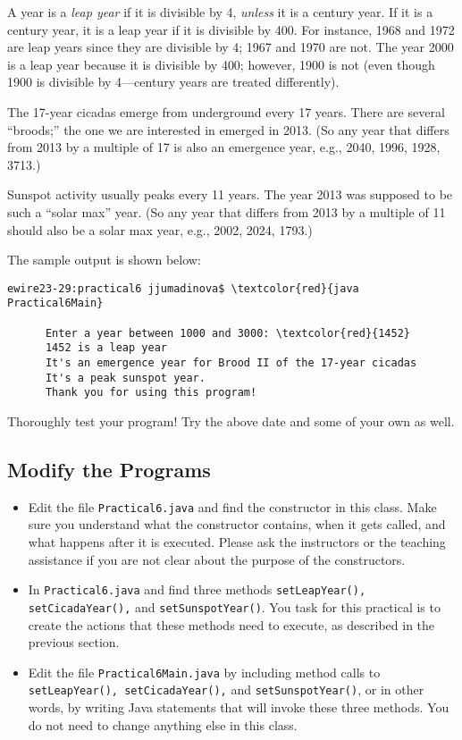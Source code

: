 \noindent A year is a {\em leap year} if it is divisible by 4, {\em unless} it is a century
year. If it is a century year, it is a leap year if it is divisible by 400. For instance,
1968 and 1972 are leap years since they are divisible by 4; 1967 and 1970 are not.
The year 2000 is a leap year because it is divisible by 400; however, 1900 is not (even
though 1900 is divisible by 4---century years are treated differently).

\noindent The 17-year cicadas emerge from underground every 17 years. There are several 
``broods;'' the one we are interested in emerged in 2013. (So any year that differs
from 2013 by a multiple of 17 is also an emergence year, e.g., 2040, 1996, 1928, 3713.)

\noindent Sunspot activity usually peaks every 11 years. The year 2013 was supposed to be such
a ``solar max'' year. (So any year that differs from 2013 by a multiple of 11 should
also be a solar max year, e.g., 2002, 2024, 1793.)


\noindent The sample output is shown below:
\begin{Verbatim}[commandchars=\\\{\}]
      ewire23-29:practical6 jjumadinova$ \textcolor{red}{java Practical6Main}
            
      Enter a year between 1000 and 3000: \textcolor{red}{1452}
      1452 is a leap year
      It's an emergence year for Brood II of the 17-year cicadas
      It's a peak sunspot year.
      Thank you for using this program! 
\end{Verbatim}

\noindent Thoroughly test your program! Try the above date and some of your own as well.

\vspace*{-.1in}
\subsection*{Modify the Programs} 
\vspace*{-.05in}
\begin{itemize}
\item Edit the file {\tt Practical6.java} and find the constructor in this class. Make sure you understand what the constructor contains, when it gets called, and what happens after it is executed. Please ask the instructors or the teaching assistance if you are not clear about the purpose of the constructors. 
\item  In {\tt Practical6.java} and find three methods {\tt setLeapYear(), setCicadaYear(),} and {\tt  setSunspotYear()}. You task for this practical is to create the actions that these methods need to execute, as described in the previous section. 
\item Edit the file {\tt Practical6Main.java} by including method calls to {\tt setLeapYear(), setCicadaYear(),} and {\tt  setSunspotYear()}, or in other words, by writing Java statements that will invoke these three methods. You do not need to change anything else in this class.
\end{itemize}

